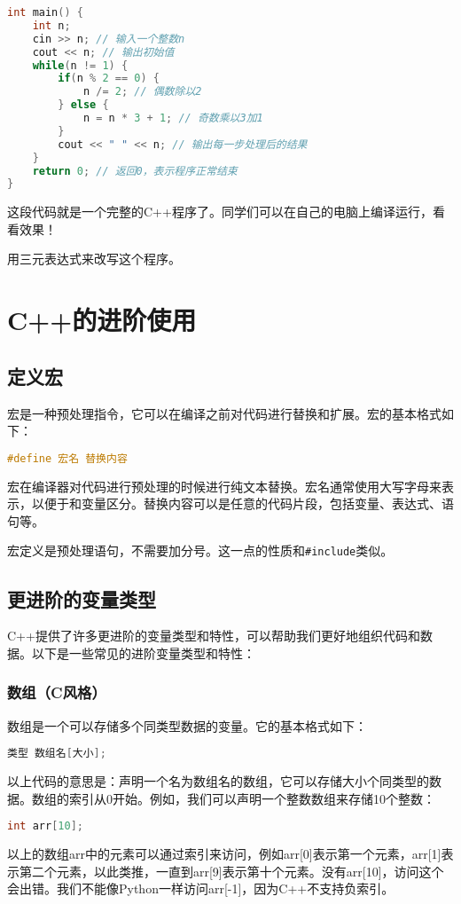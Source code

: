 \documentclass[../main.tex]{subfiles}
\begin{document}
\begin{answer}
\begin{lstlisting}[language=C++]
int main() {
    int n;
    cin >> n; // 输入一个整数n
    cout << n; // 输出初始值
    while(n != 1) {
        if(n % 2 == 0) {
            n /= 2; // 偶数除以2
        } else {
            n = n * 3 + 1; // 奇数乘以3加1
        }
        cout << " " << n; // 输出每一步处理后的结果
    }
    return 0; // 返回0，表示程序正常结束
}
\end{lstlisting}
  这段代码就是一个完整的C++程序了。同学们可以在自己的电脑上编译运行，看看效果！
\end{answer}

\begin{exercise}
  用三元表达式来改写这个程序。
\end{exercise}

\section{C++的进阶使用}

\subsection{定义宏}

宏是一种预处理指令，它可以在编译之前对代码进行替换和扩展。宏的基本格式如下：
\begin{lstlisting}[language=C++]
#define 宏名 替换内容
\end{lstlisting}
宏在编译器对代码进行预处理的时候进行纯文本替换。宏名通常使用大写字母来表示，以便于和变量区分。替换内容可以是任意的代码片段，包括变量、表达式、语句等。

宏定义是预处理语句，不需要加分号。这一点的性质和\texttt{\#include}类似。

\subsection{更进阶的变量类型}
C++提供了许多更进阶的变量类型和特性，可以帮助我们更好地组织代码和数据。以下是一些常见的进阶变量类型和特性：
\subsubsection{数组（C风格）}

数组是一个可以存储多个同类型数据的变量。它的基本格式如下：
\begin{lstlisting}[language=C++]
类型 数组名[大小];
\end{lstlisting}
以上代码的意思是：声明一个名为数组名的数组，它可以存储大小个同类型的数据。数组的索引从0开始。例如，我们可以声明一个整数数组来存储10个整数：
\begin{lstlisting}[language=C++]
int arr[10];
\end{lstlisting}
以上的数组arr中的元素可以通过索引来访问，例如arr[0]表示第一个元素，arr[1]表示第二个元素，以此类推，一直到arr[9]表示第十个元素。没有arr[10]，访问这个会出错。我们不能像Python一样访问arr[-1]，因为C++不支持负索引。
\end{document}
